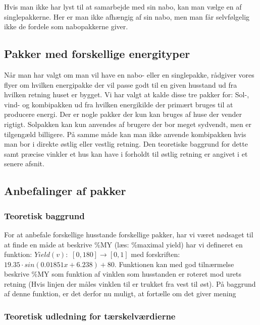 \documentclass[12pt,a4paper]{article}
\theoremstyle{break}
\theoremstyle{nonumberplain}
\begin{document}
Hvis man ikke har lyst til at samarbejde med sin nabo, kan man vælge en af singlepakkerne. 
Her er man ikke afhængig af sin nabo, men man får selvfølgelig ikke de fordele som nabopakkerne giver. 

\subsection{Pakker med forskellige energityper}
Når man har valgt om man vil have en nabo- eller en singlepakke, rådgiver vores flyer om hvilken energipakke der vil passe godt til en given husstand ud fra hvilken retning huset er bygget. 
Vi har valgt at kalde disse tre pakker for: Sol-, vind- og kombipakken ud fra hvilken energikilde der primært bruges til at producere energi. 
Der er nogle pakker der kun kan bruges af huse der vender rigtigt. Solpakken kan kun anvendes af brugere der bor meget sydvendt, men er tilgengæld billigere. 
På samme måde kan man ikke anvende kombipakken hvis man bor i direkte østlig eller vestlig retning. 
Den teoretiske baggrund for dette samt præcise vinkler et hus kan have i forholdt til østlig retning er angivet i et senere afsnit.  

\pagebreak

\subsection{Anbefalinger af pakker}
\subsubsection{Teoretisk baggrund}
For at anbefale forskellige husstande forskellige pakker, har vi været nødsaget til at finde en måde at beskrive \%MY (læs: \%maximal yield) har vi defineret en funktion: $Yield(v):$  $[0,180] \rightarrow [0,1]$ med forskriften: $19.35 \cdot sin(0.01851x + 6.238) + 80$. 
Funktionen kan med god tilnærmelse beskrive \%MY som funktion af vinklen som husstanden er roteret mod urets retning (Hvis linjen der måles vinklen til er trukket fra vest til øst). 
På baggrund af denne funktion, er det derfor nu muligt, at fortælle om det giver mening 

\subsubsection{Teoretisk udledning for tærskelværdierne}
\end{document}

